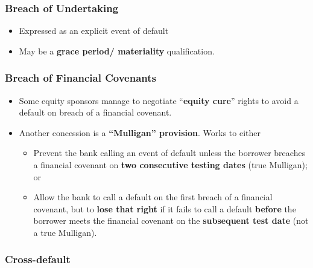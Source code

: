 \documentclass[
]{article}
\providecommand{\tightlist}{%
  \setlength{\itemsep}{0pt}\setlength{\parskip}{0pt}}
\begin{document}
\hypertarget{breach-of-undertaking}{%
\subsubsection{Breach of Undertaking}\label{breach-of-undertaking}}

\begin{itemize}
\tightlist
\item
  Expressed as an explicit event of default
\item
  May be a \textbf{grace period/ materiality} qualification.
\end{itemize}

\hypertarget{breach-of-financial-covenants}{%
\subsubsection{Breach of Financial
Covenants}\label{breach-of-financial-covenants}}

\begin{itemize}
\tightlist
\item
  Some equity sponsors manage to negotiate ``\textbf{equity cure}''
  rights to avoid a default on breach of a financial covenant.
\item
  Another concession is a \textbf{``Mulligan'' provision}. Works to
  either

  \begin{itemize}
  \tightlist
  \item
    Prevent the bank calling an event of default unless the borrower
    breaches a financial covenant on \textbf{two consecutive testing
    dates} (true Mulligan); or
  \item
    Allow the bank to call a default on the first breach of a financial
    covenant, but to \textbf{lose that right} if it fails to call a
    default \textbf{before} the borrower meets the financial covenant on
    the \textbf{subsequent test date} (not a true Mulligan).
  \end{itemize}
\end{itemize}

\hypertarget{cross-default}{%
\subsubsection{Cross-default}\label{cross-default}}
\end{document}
